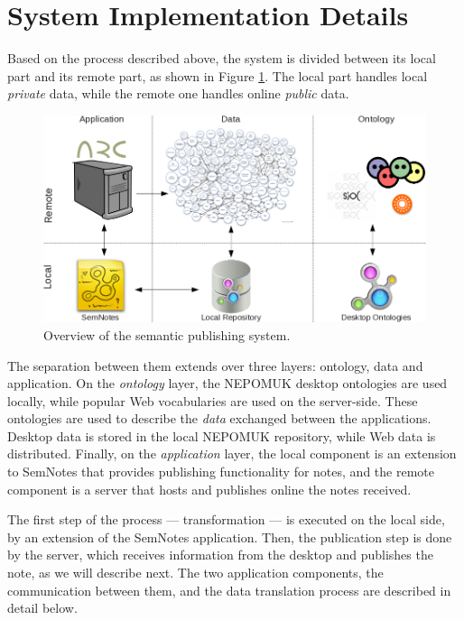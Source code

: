 \section{System Implementation Details}
\label{sec:sembloggingsystem}

Based on the process described above, the system is divided between its local part and its remote part, as shown in Figure \ref{fig:semblogsystem}. The local part handles local \emph{private} data, while the remote one handles online \emph{public} data. 
\begin{figure}[htb]
  \begin{center}
    \includegraphics[width=0.8\linewidth]{chapters/core/img/system}
    \caption{Overview of the semantic publishing system.}
    \label{fig:semblogsystem}
  \end{center}
\end{figure}
The separation between them extends over three layers: ontology, data and application.
On the \emph{ontology} layer, the NEPOMUK desktop ontologies are used locally, while popular Web vocabularies are used on the server-side. These ontologies are used to describe the \emph{data} exchanged between the applications. Desktop data is stored in the local NEPOMUK repository, while Web data is distributed. Finally, on the \emph{application} layer, the local component is an extension to SemNotes that provides publishing functionality for notes, and the remote component is a server that hosts and publishes online the notes received.

The first step of the process --- transformation --- is executed on the local side, by an extension of the SemNotes application. Then, the publication step is done by the server, which receives information from the desktop and publishes the note, as we will describe next. The two application components, the communication between them, and the data translation process are described in detail below.







